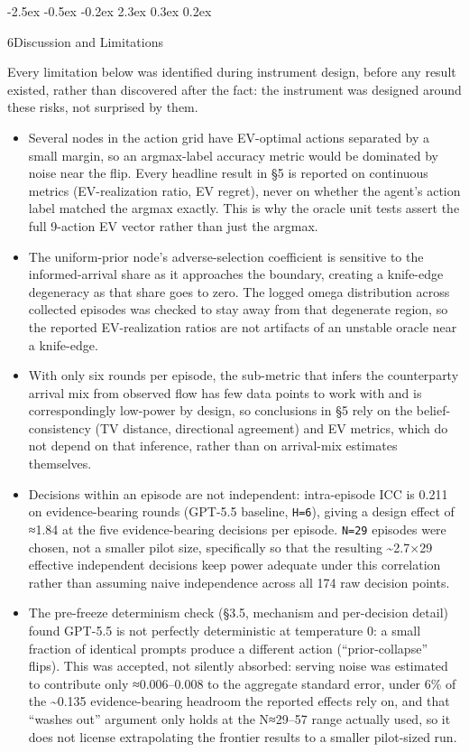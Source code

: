 \documentclass[
  11pt,
]{article}
\makeatletter
\providecommand{\tightlist}{%
  \setlength{\itemsep}{0pt}\setlength{\parskip}{0pt}}
\renewcommand{\section}{%
  \@startsection{section}{1}{\z@}%
                {-2.5ex \@plus -0.5ex \@minus -0.2ex}%
                { 2.3ex \@plus  0.3ex \@minus  0.2ex}%
                {\large\bf\raggedright}%
}
\makeatother
\begin{document}
\section{6\quad Discussion and Limitations}\label{discussion-and-limitations}

Every limitation below was identified during instrument design, before any result existed, rather than discovered after the fact: the instrument was designed around these risks, not surprised by them.

\begin{itemize}
\tightlist
\item
  Several nodes in the action grid have EV-optimal actions separated by a small margin, so an argmax-label accuracy metric would be dominated by noise near the flip. Every headline result in §5 is reported on continuous metrics (EV-realization ratio, EV regret), never on whether the agent's action label matched the argmax exactly. This is why the oracle unit tests assert the full 9-action EV vector rather than just the argmax.
\item
  The uniform-prior node's adverse-selection coefficient is sensitive to the informed-arrival share as it approaches the boundary, creating a knife-edge degeneracy as that share goes to zero. The logged omega distribution across collected episodes was checked to stay away from that degenerate region, so the reported EV-realization ratios are not artifacts of an unstable oracle near a knife-edge.
\item
  With only six rounds per episode, the sub-metric that infers the counterparty arrival mix from observed flow has few data points to work with and is correspondingly low-power by design, so conclusions in §5 rely on the belief-consistency (TV distance, directional agreement) and EV metrics, which do not depend on that inference, rather than on arrival-mix estimates themselves.
\item
  Decisions within an episode are not independent: intra-episode ICC is 0.211 on evidence-bearing rounds (GPT-5.5 baseline, \texttt{H=6}), giving a design effect of ≈1.84 at the five evidence-bearing decisions per episode. \texttt{N=29} episodes were chosen, not a smaller pilot size, specifically so that the resulting \textasciitilde2.7×29 effective independent decisions keep power adequate under this correlation rather than assuming naive independence across all 174 raw decision points.
\item
  The pre-freeze determinism check (§3.5, mechanism and per-decision detail) found GPT-5.5 is not perfectly deterministic at temperature 0: a small fraction of identical prompts produce a different action (``prior-collapse'' flips). This was accepted, not silently absorbed: serving noise was estimated to contribute only ≈0.006--0.008 to the aggregate standard error, under 6\% of the \textasciitilde0.135 evidence-bearing headroom the reported effects rely on, and that ``washes out'' argument only holds at the N≈29--57 range actually used, so it does not license extrapolating the frontier results to a smaller pilot-sized run.

\end{itemize}
\end{document}
